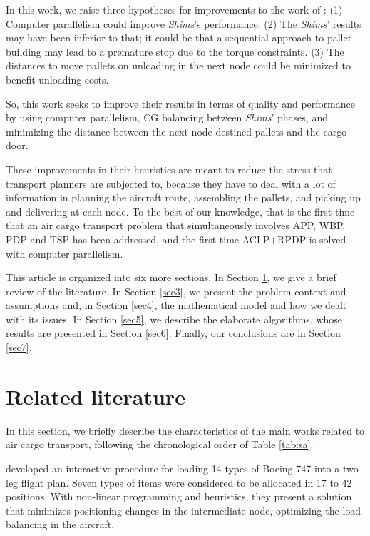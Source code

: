 \documentclass[preprint,authoryear]{elsarticle}
\begin{document}
In this work, we raise three hypotheses for improvements to the work of \cite{MesquitaSanches2023}:
(1) Computer parallelism could improve {\it Shims}'s performance.
(2) The {\it Shims}' results may have been inferior to that; it could be that a sequential approach to pallet building may lead to a premature stop due to the torque constraints.
(3) The distances to move pallets on unloading in the next node could be minimized to benefit unloading costs.

So, this work seeks to improve their results in terms of quality and performance by using computer parallelism, CG balancing between {\it Shims}' phases, and minimizing the distance between the next node-destined pallets and the cargo door.

These improvements in their heuristics are meant to reduce the stress that transport planners are subjected to, because they have to deal with a lot of information in planning the aircraft route, assembling the pallets, and picking up and delivering at each node. To the best of our knowledge, that is the first time that an air cargo transport problem that simultaneously involves APP, WBP, PDP and TSP has been addressed, and the first time ACLP+RPDP is solved with computer parallelism.

This article is organized into six more sections. In Section \ref{sec2}, we give a brief review of the literature. In Section \ref{sec3}, we present the problem context and assumptions and, in Section \ref{sec4}, the mathematical model and how we dealt with its issues. In Section \ref{sec5}, we describe the elaborate algorithms, whose results are presented in Section \ref{sec6}. Finally, our conclusions are in Section \ref{sec7}.


\section{Related literature}
\label{sec2}

In this section, we briefly describe the characteristics of the main works related to air cargo transport, following the chronological order of Table \ref{tab:sa}.

\cite{LarsenMikkelsen1979} developed an interactive procedure for loading 14 types of Boeing 747 into a two-leg flight plan. Seven types of items were considered to be allocated in 17 to 42 positions. With non-linear programming and heuristics, they present a solution that minimizes positioning changes in the intermediate node, optimizing the load balancing in the aircraft.
\end{document}
